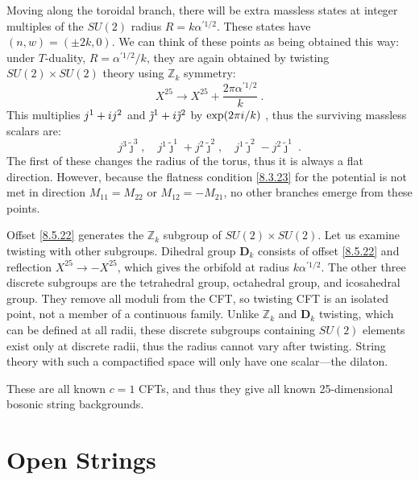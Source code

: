 Moving along the toroidal branch, there will be extra massless states at integer multiples of the $SU(2)$ radius $R=k \alpha^{\prime 1/2} $. 
These states have $(n, w)=(\pm 2 k, 0)$. 
We can think of these points as being obtained this way: under $T$-duality, $R=\alpha^{\prime 1/2} / k$, 
they are again obtained by twisting $S U(2) \times S U(2)$ theory using $\mathds{Z}_{k}$ symmetry:
\begin{equation}
	X^{25} \rightarrow X^{25}+\frac{2 \pi \alpha^{\prime 1/2}}{k} \:. \label{8.5.22}
\end{equation}
This multiplies $j^{1}+i j^{2}$ and $\tilde{\jmath}^{1}+i \tilde{\jmath}^{2}$ by $\exp (2 \pi i / k)$ , thus the surviving massless scalars are:
\begin{equation}
	j^{3} \tilde{\jmath}^{3}, \quad j^{1} \tilde{\jmath}^{1}+j^{2} \tilde{\jmath}^{2}, \quad 
	j^{1} \tilde{\jmath}^{2}-j^{2} \tilde{\jmath}^{1} \:. \label{8.5.23}
\end{equation}
The first of these changes the radius of the torus, thus it is always a flat direction. However, because the flatness condition \eqref{8.3.23} for the potential is not met in direction $M_{11}=M_{22}$ or $M_{12}=-M_{21}$, 
no other branches emerge from these points.

Offset \eqref{8.5.22} generates the $\mathds{Z}_{k}$ subgroup of $S U(2) \times S U(2) $. Let us examine twisting with other subgroups. 
Dihedral group $\mathbf{D}_{k}$ consists of offset \eqref{8.5.22} and reflection $X^{25} \rightarrow-X^{25}$, which gives the orbifold at radius $k \alpha^{\prime 1/2}$. 
The other three discrete subgroups are the tetrahedral group, octahedral group, and icosahedral group. They remove all moduli from the CFT, so twisting CFT is an isolated point, not a member of a continuous family. 
Unlike $\mathds{Z}_{k}$ and $\mathbf{D}_{k}$ twisting, which can be defined at all radii, these discrete subgroups containing $S U(2)$ elements exist only at discrete radii, 
thus the radius cannot vary after twisting. String theory with such a compactified space will only have one scalar—the dilaton. 

These are all known $c=1$ CFTs, and thus they give all known 25-dimensional bosonic string backgrounds.

\section{\texorpdfstring{Open Strings}{8.6 Open Strings}} \label{sec:8.6}

